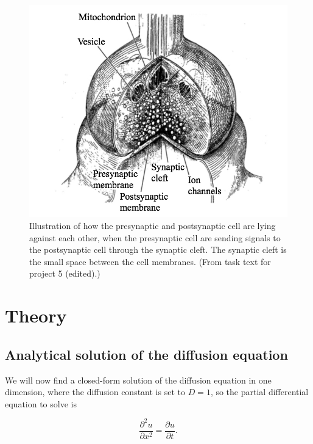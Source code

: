 \documentclass[12pt]{article}
\begin{document}
\begin{flushleft}
\begin{figure}[!h]
\begin{center}
\includegraphics[scale=0.35]{cell2}
\caption{\label{fig:cell}Illustration of how the presynaptic and postsynaptic cell are lying against each other, when the presynaptic cell are sending signals to the postsynaptic cell through the synaptic cleft. The synaptic cleft is the small space between the cell membranes. (From task text for project 5 (edited).)}
\end{center}
\end{figure}

\newpage
\section{Theory}
\subsection{Analytical solution of the diffusion equation\label{sect:analytical_solution}}
We will now find a closed-form solution of the diffusion equation in one dimension, where the diffusion constant is set to $D = 1$, so the partial differential equation to solve is 

\vspace{5mm}
\begin{equation}\label{eq:diffusion_1d}
\frac{\partial^2 u}{\partial x^2} = \frac{\partial u}{\partial t}.
\end{equation}
\vspace{5mm} 


\end{flushleft}
\end{document}
